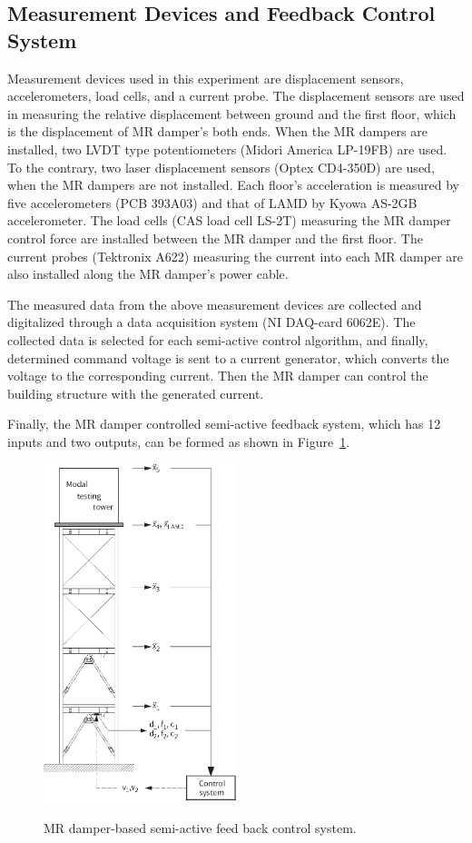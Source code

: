 \subsection{Measurement Devices and Feedback Control System}

Measurement devices used in this experiment are displacement sensors, accelerometers, load cells, and a current probe. The displacement sensors are used in measuring the relative displacement between ground and the first floor, which is the displacement of MR damper’s both ends. When the MR dampers are installed, two LVDT type potentiometers (Midori America LP-19FB) are used. To the contrary, two laser displacement sensors (Optex CD4-350D) are used, when the MR dampers are not installed. Each floor’s acceleration is measured by five accelerometers (PCB 393A03) and that of LAMD by Kyowa AS-2GB accelerometer. The load cells (CAS load cell LS-2T) measuring the MR damper control force are installed between the MR damper and the first floor. The current probes (Tektronix A622) measuring the current into each MR damper are also installed along the MR damper’s power cable.

The measured data from the above measurement devices are collected and digitalized through a data acquisition system (NI DAQ-card 6062E). The collected data is selected for each semi-active control algorithm, and finally, determined command voltage is sent to a current generator, which converts the voltage to the corresponding current. Then the MR damper can control the building structure with the generated current.

Finally, the MR damper controlled semi-active feedback system, which has 12 inputs and two outputs, can be formed as shown in Figure~\ref{fig:n3-11}.

\begin{figure}[!ht]
\centering
\includegraphics[width=0.50\textwidth] {figure/n3-11.eps}
\label{fig:n3-11}
\caption{MR damper-based semi-active feed back control system.}
\end{figure}

